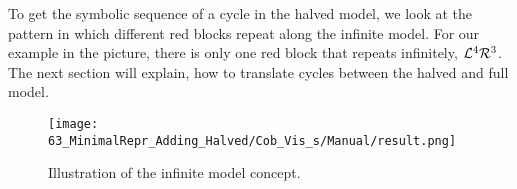 To get the symbolic sequence of a cycle in the halved model, we look at the pattern in which different red blocks repeat along the infinite model.
For our example in the picture, there is only one red block that repeats infinitely, $\mathcal{L}^4\mathcal{R}^3$.
The next section will explain, how to translate cycles between the halved and full model.

\begin{figure}
	\centering
	\texttt{[image: 63\_MinimalRepr\_Adding\_Halved/Cob\_Vis\_s/Manual/result.png]}
	\caption{Illustration of the infinite model concept.}
	\label{fig:minrep.infinite.model.concept}
\end{figure}



